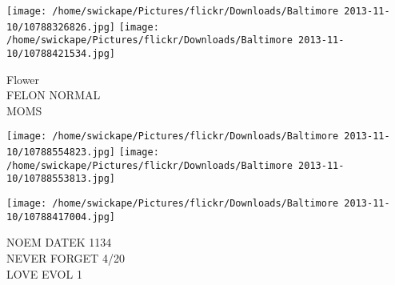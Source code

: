 \documentclass[10pt,letterpaper]{article}
\begin{document}
\vspace{0.25in}
\texttt{[image: /home/swickape/Pictures/flickr/Downloads/Baltimore 2013-11-10/10788326826.jpg]}
\texttt{[image: /home/swickape/Pictures/flickr/Downloads/Baltimore 2013-11-10/10788421534.jpg]}

Flower\\
FELON NORMAL\\
MOMS
\pagebreak

\texttt{[image: /home/swickape/Pictures/flickr/Downloads/Baltimore 2013-11-10/10788554823.jpg]}
\texttt{[image: /home/swickape/Pictures/flickr/Downloads/Baltimore 2013-11-10/10788553813.jpg]}

\texttt{[image: /home/swickape/Pictures/flickr/Downloads/Baltimore 2013-11-10/10788417004.jpg]}

NOEM DATEK 1134\\
NEVER FORGET 4/20\\
LOVE EVOL 1
\pagebreak
\end{document}
